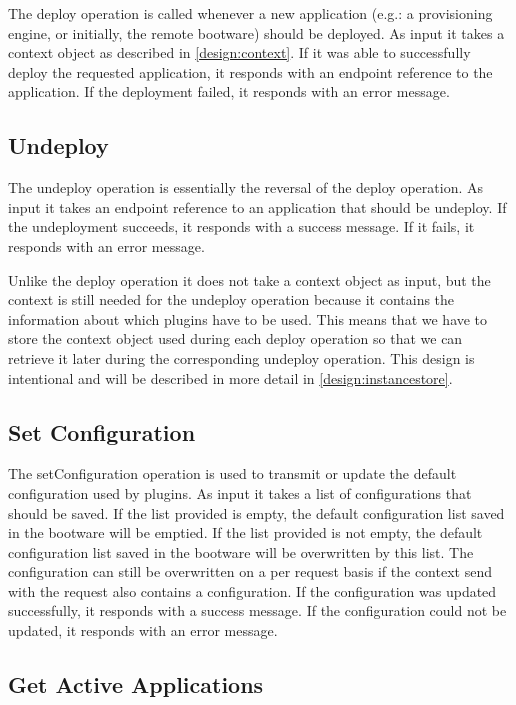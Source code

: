 The deploy operation is called whenever a new application (e.g.: a provisioning engine, or initially, the remote bootware) should be deployed.
As input it takes a context object as described in \autoref{design:context}.
If it was able to successfully deploy the requested application, it responds with an endpoint reference to the application.
If the deployment failed, it responds with an error message.

\subsection{Undeploy}

The undeploy operation is essentially the reversal of the deploy operation.
As input it takes an endpoint reference to an application that should be undeploy.
If the undeployment succeeds, it responds with a success message.
If it fails, it responds with an error message.

Unlike the deploy operation it does not take a context object as input, but the context is still needed for the undeploy operation because it contains the information about which plugins have to be used.
This means that we have to store the context object used during each deploy operation so that we can retrieve it later during the corresponding undeploy operation.
This design is intentional and will be described in more detail in \autoref{design:instancestore}.

\subsection{Set Configuration}

The setConfiguration operation is used to transmit or update the default configuration used by plugins.
As input it takes a list of configurations that should be saved.
If the list provided is empty, the default configuration list saved in the bootware will be emptied.
If the list provided is not empty, the default configuration list saved in the bootware will be overwritten by this list.
The configuration can still be overwritten on a per request basis if the context send with the request also contains a configuration.
If the configuration was updated successfully, it responds with a success message.
If the configuration could not be updated, it responds with an error message.

\subsection{Get Active Applications}

